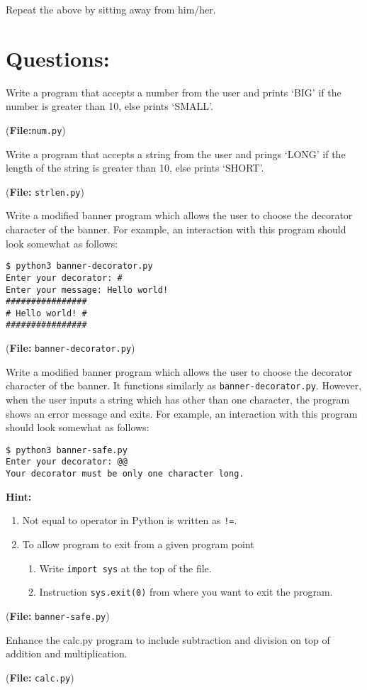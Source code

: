 \documentclass[addpoints,11pt]{exam}
\makeatletter
\newcommand{\kctt}[1]{\lstinline[basicstyle=\ttfamily]@#1@}
\makeatother
\begin{document}
Repeat the above by sitting away from him/her.

\section*{Questions:}

\begin{questions}

\question
Write a program that accepts a number from the user and prints `BIG' if the number is greater than 10, else prints `SMALL'.

(\textbf{\color{BrickRed}File:}\lstinline[basicstyle=\ttfamily]@num.py@)

\question
Write a program that accepts a string from the user and prings `LONG' if the length of the string is greater than 10, else prints `SHORT'.

(\textbf{\color{BrickRed}File:} \lstinline[basicstyle=\ttfamily]@strlen.py@)

\question
Write a modified banner program which allows the user to choose the decorator character of the banner. For example, an interaction with this program should look somewhat as follows:

\begin{lstlisting}[style=oc]
$ python3 banner-decorator.py
Enter your decorator: #
Enter your message: Hello world!
################
# Hello world! #
################
\end{lstlisting}

(\textbf{\color{BrickRed}File:} \kctt{banner-decorator.py})

\question
Write a modified banner program which allows the user to choose the decorator character of the banner. It functions similarly as \kctt{banner-decorator.py}. However, when the user inputs a string which has other than one character, the program shows an error message and exits. For example, an interaction with this program should look somewhat as follows:

\begin{lstlisting}[style=oc]
$ python3 banner-safe.py 
Enter your decorator: @@
Your decorator must be only one character long.
\end{lstlisting}

\textbf{\color{BrickRed}Hint:}
\begin{enumerate}
\item Not equal to operator in Python is written as \kctt{!=}.
\item To allow program to exit from a given program point
	\begin{enumerate}
	\item Write \kctt{import sys} at the top of the file.
	\item Instruction \kctt{sys.exit(0)} from where you want to exit the program.
	\end{enumerate}
\end{enumerate}
(\textbf{\color{BrickRed}File:} \kctt{banner-safe.py})

\question
Enhance the calc.py program to include subtraction and division on top of addition and multiplication.

(\textbf{\color{BrickRed}File:} \kctt{calc.py})

\end{questions}
\end{document}
